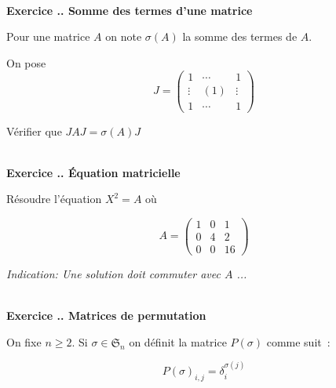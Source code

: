 \documentclass{article}
\newcounter{exo}
\newcommand{\exercice}[1][\null]{\textbf{\\ Exercice \thesection.\theexo. #1} \addtocounter{exo}{1}}
\newcommand{\indication}[1]{\begin{flushright}\textit{Indication: #1}\end{flushright}}
\begin{document}
\exercice[Somme des termes d'une matrice]
Pour une matrice $A$ on note $\sigma(A)$ la somme 
des termes de $A$. 

On pose \begin{equation*} J = \begin{pmatrix} 1 & \cdots & 1 \\ \vdots & (1) &
\vdots \\ 1 & \cdots & 1 \end{pmatrix} \end{equation*}

Vérifier que $JAJ = \sigma (A) J$

\exercice[Équation matricielle]

Résoudre l'équation $X^2 = A$ où 

\begin{equation*}
    A = \begin{pmatrix}
            1 & 0 & 1 \\
            0 & 4 & 2 \\
            0 & 0 & 16 
        \end{pmatrix}
\end{equation*}
\indication{Une solution doit commuter avec $A$ ...}

\exercice[Matrices de permutation]

\begin{center}
\end{center}

On fixe $n \geq 2$. Si $\sigma \in \mathfrak{S}_n$ on 
définit la matrice $P(\sigma)$ comme suit~:

\begin{equation*}
    P(\sigma)_{i,j} = \delta_i^{\sigma(j)}
\end{equation*}
\end{document}
